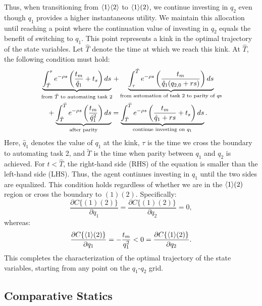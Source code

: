 \documentclass{article}
\theoremstyle{plain}
\theoremstyle{plain}
\begin{document}
Thus, when transitioning from $\langle 1 \rangle\langle 2 \rangle$ to $\langle 1 \rangle( 2 )$, we continue investing in $q_{2}$ even though $q_{1}$ provides a higher instantaneous utility.  
We maintain this allocation until reaching a point where the continuation value of investing in $q_{2}$ equals the benefit of switching to $q_{1}$.  
This point represents a kink in the optimal trajectory of the state variables.  
Let $\hat{T}$ denote the time at which we reach this kink.  
At $\hat{T}$, the following condition must hold:
\begin{equation}
\begin{split}
    & \underbrace{\int_{\hat{T}}^{\tau} e^{-\rho s} \left(\frac{t_{m}}{\hat{q}_{1}} + t_{s}\right) ds}_{\text{from $\hat{T}$ to automating task 2}} 
    + \underbrace{\int_{\tau}^{\tilde{T}} e^{-\rho s} \left(\frac{t_{m}}{\hat{q}_{1}(q_{2,0} + rs)}\right) ds}_{\text{from automation of task 2 to parity of $q$s}} \\
    & \quad + \underbrace{\int_{\tilde{T}}^{\bar{T}} e^{-\rho s} \left(\frac{t_{m}}{\hat{q}_{1}^{2}}\right) ds}_{\text{after parity}} 
    = \underbrace{\int_{\hat{T}}^{\bar{T}} e^{-\rho s} \left(\frac{t_{m}}{\hat{q}_{1} + rs} + t_{s}\right) ds}_{\text{continue investing on $q_{1}$}}.
\end{split}
\label{eq:kink_eq}
\end{equation}
Here, $\hat{q}_{1}$ denotes the value of $q_{1}$ at the kink, $\tau$ is the time we cross the boundary to automating task 2, and $\tilde{T}$ is the time when parity between $q_{1}$ and $q_{2}$ is achieved.  
For $t<\hat{T}$, the right-hand side (RHS) of the equation is smaller than the left-hand side (LHS).  
Thus, the agent continues investing in $q_{1}$ until the two sides are equalized.  
This condition holds regardless of whether we are in the $\langle 1 \rangle( 2 )$ region or cross the boundary to $(1)(2)$.  
Specifically: 
\[
\frac{\partial C\{(1)(2)\}}{\partial q_{1}}=\frac{\partial C\{(1)(2)\}}{\partial q_{2}}=0,
\]
whereas:
\[
\frac{\partial C\{\langle 1 \rangle( 2 )\}}{\partial q_{1}}=-\frac{t_{m}}{q_{1}^{2}}<0=\frac{\partial C\{\langle 1 \rangle( 2 )\}}{\partial q_{2}}.
\]
This completes the characterization of the optimal trajectory of the state variables, starting from any point on the $q_{1}$-$q_{2}$ grid.

\subsection{Comparative Statics}
\end{document}
